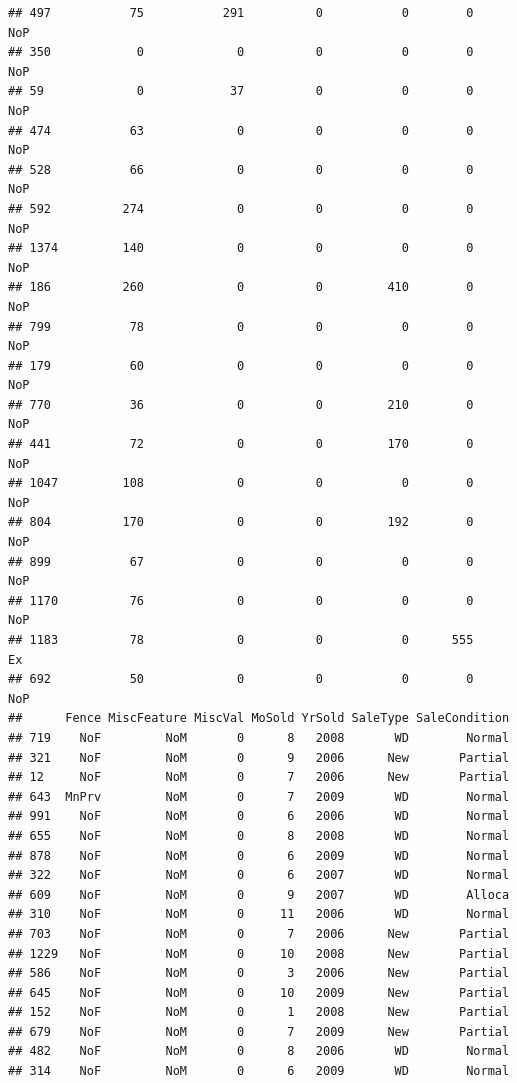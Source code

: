 \documentclass[]{article}
\begin{document}
\begin{verbatim}
## 497           75           291          0           0        0    NoP
## 350            0             0          0           0        0    NoP
## 59             0            37          0           0        0    NoP
## 474           63             0          0           0        0    NoP
## 528           66             0          0           0        0    NoP
## 592          274             0          0           0        0    NoP
## 1374         140             0          0           0        0    NoP
## 186          260             0          0         410        0    NoP
## 799           78             0          0           0        0    NoP
## 179           60             0          0           0        0    NoP
## 770           36             0          0         210        0    NoP
## 441           72             0          0         170        0    NoP
## 1047         108             0          0           0        0    NoP
## 804          170             0          0         192        0    NoP
## 899           67             0          0           0        0    NoP
## 1170          76             0          0           0        0    NoP
## 1183          78             0          0           0      555     Ex
## 692           50             0          0           0        0    NoP
##      Fence MiscFeature MiscVal MoSold YrSold SaleType SaleCondition
## 719    NoF         NoM       0      8   2008       WD        Normal
## 321    NoF         NoM       0      9   2006      New       Partial
## 12     NoF         NoM       0      7   2006      New       Partial
## 643  MnPrv         NoM       0      7   2009       WD        Normal
## 991    NoF         NoM       0      6   2006       WD        Normal
## 655    NoF         NoM       0      8   2008       WD        Normal
## 878    NoF         NoM       0      6   2009       WD        Normal
## 322    NoF         NoM       0      6   2007       WD        Normal
## 609    NoF         NoM       0      9   2007       WD        Alloca
## 310    NoF         NoM       0     11   2006       WD        Normal
## 703    NoF         NoM       0      7   2006      New       Partial
## 1229   NoF         NoM       0     10   2008      New       Partial
## 586    NoF         NoM       0      3   2006      New       Partial
## 645    NoF         NoM       0     10   2009      New       Partial
## 152    NoF         NoM       0      1   2008      New       Partial
## 679    NoF         NoM       0      7   2009      New       Partial
## 482    NoF         NoM       0      8   2006       WD        Normal
## 314    NoF         NoM       0      6   2009       WD        Normal

\end{verbatim}
\end{document}
